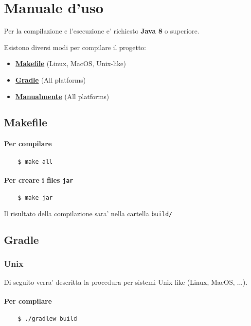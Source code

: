 \section{Manuale d'uso}

Per la compilazione e l'esecuzione e' richiesto \textbf{Java 8} o superiore.

Esistono diversi modi per compilare il progetto:
\begin{itemize}
	\item \hyperlink{makefile}{\textbf{Makefile}} (Linux, MacOS, Unix-like)
	\item \hyperlink{gradle}{\textbf{Gradle}} (All platforms)
	\item \hyperlink{manual}{\textbf{Manualmente}} (All platforms)
\end{itemize}

\hypertarget{makefile}{}
\subsection{Makefile}

\paragraph{Per compilare}
\begin{verbatim}
	$ make all
\end{verbatim}

\paragraph{Per creare i files \texttt{jar}}
\begin{verbatim}
	$ make jar
\end{verbatim}

Il risultato della compilazione sara' nella cartella \texttt{build/}

\bigskip
\bigskip
\hypertarget{gradle}{}
\subsection{Gradle}

\subsubsection{Unix}
Di seguito verra' descritta la procedura per sistemi Unix-like (Linux, MacOS, ...).

\paragraph{Per compilare}
\begin{verbatim}
	$ ./gradlew build
\end{verbatim}


